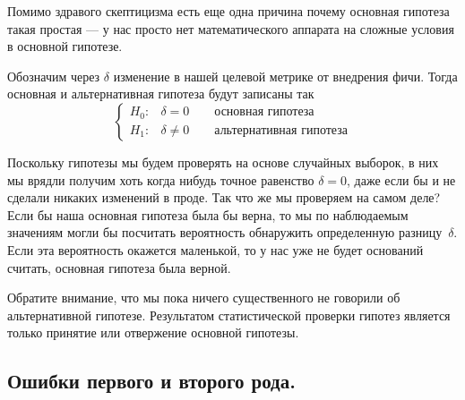 \documentclass[../handbook.tex]{subfiles}
\begin{document}
Помимо здравого скептицизма есть еще одна причина почему основная гипотеза такая простая --- у нас просто нет математического аппарата на сложные условия в основной гипотезе.

Обозначим через $\delta$ изменение в нашей целевой метрике от внедрения фичи. Тогда основная и альтернативная гипотеза будут записаны так
\begin{equation*}
    \begin{cases}
        H_0: & \delta = 0 \qquad\text{основная гипотеза}\\
        H_1: & \delta \ne 0 \qquad\text{альтернативная гипотеза}
    \end{cases}
\end{equation*}

Поскольку гипотезы мы будем проверять на основе случайных выборок, в них мы врядли получим хоть когда нибудь точное равенство $\delta = 0$, даже если бы и не сделали никаких изменений в проде. Так что же мы проверяем на самом деле? Если бы наша основная гипотеза была бы верна, то мы по наблюдаемым значениям могли бы посчитать вероятность обнаружить определенную разницу~$\delta$. Если эта вероятность окажется маленькой, то у нас уже не будет оснований считать, основная гипотеза была верной.

Обратите внимание, что мы пока ничего существенного не говорили об альтернативной гипотезе. Результатом статистической проверки гипотез является только принятие или отвержение основной гипотезы.

\subsection{Ошибки первого и второго рода.} 
\end{document}
